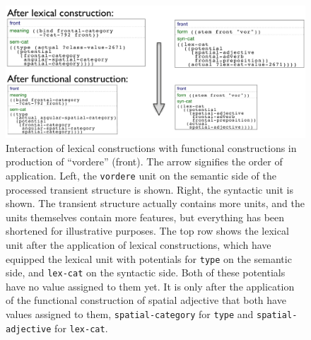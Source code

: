 \begin{figure}
\begin{center}
\includegraphics[width=1.0\columnwidth]{figs/production-vordere}
\end{center}
\caption[Interaction of lexical and functional constructions -- syntax]{
Interaction of lexical constructions with 
functional constructions in production of
``vordere'' (front).
The arrow signifies the order of application. 
Left, the {\footnotesize\tt vordere} unit on the semantic side of the 
processed transient structure is shown. 
Right, the syntactic unit is shown. The 
transient structure actually contains more units, and the units 
themselves contain more features, but
everything has been shortened for illustrative purposes. The 
top row shows the lexical unit after
the application of lexical constructions, which have equipped 
the lexical unit with potentials
for {\footnotesize\tt type} on the semantic side, and {\footnotesize\tt lex-cat}  
on the syntactic side. Both of
these potentials have no value assigned to them yet. It is only 
after the application of the functional
construction of spatial adjective that both have values assigned 
to them, {\footnotesize\tt spatial-category}
for {\footnotesize\tt type} and {\footnotesize\tt spatial-adjective} for {\footnotesize\tt lex-cat}.}
\label{f:production-vordere}
\end{figure}





